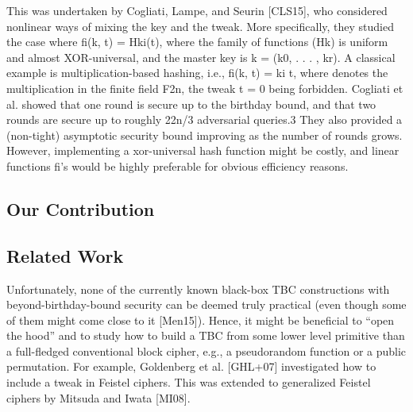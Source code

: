 This was undertaken by Cogliati, Lampe, and Seurin [CLS15], who considered nonlinear
ways of mixing the key and the tweak. More specifically, they studied the case where fi(k, t) =
Hki(t), where the family of functions (Hk) is uniform and almost XOR-universal, and the
master key is k = (k0, . . . , kr). A classical example is multiplication-based hashing, i.e.,
fi(k, t) = ki 
t, where 
denotes the multiplication in the finite field F2n, the tweak t = 0
being forbidden. Cogliati et al. showed that one round is secure up to the birthday bound,
and that two rounds are secure up to roughly 22n/3 adversarial queries.3 They also provided a
(non-tight) asymptotic security bound improving as the number of rounds grows. However,
implementing a xor-universal hash function might be costly, and linear functions fi’s would be
highly preferable for obvious efficiency reasons.




\subsection{Our Contribution}




\medskip{}



\medskip{}








\subsection{Related Work}


Unfortunately, none of the currently known black-box
TBC constructions with beyond-birthday-bound security can be deemed truly practical (even
though some of them might come close to it [Men15]). Hence, it might be beneficial to “open
the hood” and to study how to build a TBC from some lower level primitive than a full-fledged
conventional block cipher, e.g., a pseudorandom function or a public permutation. For example,
Goldenberg et al. [GHL+07] investigated how to include a tweak in Feistel ciphers. This was
extended to generalized Feistel ciphers by Mitsuda and Iwata [MI08].





